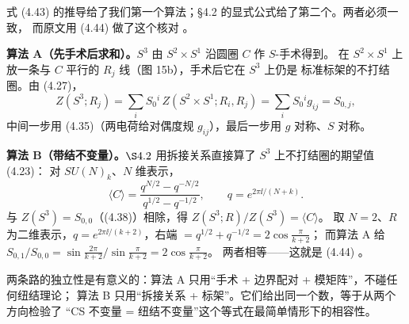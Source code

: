 \begin{derivation}
式 (4.43) 的推导给了我们第一个算法；\S4.2 的显式公式给了第二个。两者必须一致，
而原文用 (4.44) 做了这个核对 。

\textbf{算法 A（先手术后求和）。}$S^3$ 由 $S^2\times S^1$ 沿圆圈 $C$ 作 $S$-手术得到。
在 $S^2\times S^1$ 上放一条与 $C$ 平行的 $R_j$ 线（图 15b），手术后它在 $S^3$ 上仍是
标准标架的不打结圈。由 (4.27)，
\[
Z(S^3;R_j)=\sum_iS_0{}^i\,Z(S^2\times S^1;R_i,R_j)
=\sum_iS_0{}^i g_{ij}=S_{0,j},
\]
中间一步用 (4.35)（两电荷给对偶度规 $g_{ij}$），最后一步用 $g$ 对称、$S$ 对称。

\textbf{算法 B（带结不变量）。}$\S4.2$ 用拆接关系直接算了 $S^3$ 上不打结圈的期望值 (4.23)：
对 $SU(N)_k$、$N$ 维表示，
\[
\langle C\rangle=\frac{q^{N/2}-q^{-N/2}}{q^{1/2}-q^{-1/2}},
\qquad q=e^{2\pi\ii/(N+k)} .
\]
与 $Z(S^3)=S_{0,0}$（(4.38)）相除，得 $Z(S^3;R)/Z(S^3)=\langle C\rangle$。
取 $N=2$、$R$ 为二维表示，$q=e^{2\pi\ii/(k+2)}$，右端 $=q^{1/2}+q^{-1/2}=2\cos\frac{\pi}{k+2}$；
而算法 A 给 $S_{0,1}/S_{0,0}=\sin\frac{2\pi}{k+2}\big/\sin\frac{\pi}{k+2}=2\cos\frac{\pi}{k+2}$。
两者相等——这就是 (4.44) 。\ours

两条路的独立性是有意义的：算法 A 只用“手术 + 边界配对 + 模矩阵”，不碰任何纽结理论；
算法 B 只用“拆接关系 + 标架”。它们给出同一个数，等于从两个方向检验了
“CS 不变量 = 纽结不变量”这个等式在最简单情形下的相容性。
\end{derivation}

